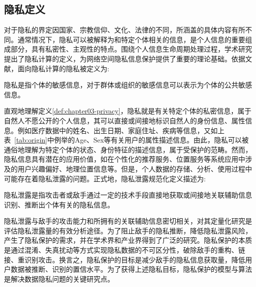 \subsection{隐私定义}
对于隐私的界定因国家、宗教信仰、文化、法律的不同，所涵盖的具体内容有所不同\cite{Lifenghua16}。通常情况下，隐私可以被解释为和特定个体相关的信息，是个人信息的重要组成部分，具有私密性、主观性的特点。围绕个人信息生命周期处理过程，学术研究提出了隐私计算的定义，为网络空间隐私信息保护提供了重要的理论基础\cite{Lifenghua16}。依据文献，面向隐私计算的隐私被定义为:

\begin{definition}\label{def:chapter03-privacy}隐私是指个体的敏感信息，对于群体或组织的敏感信息可以表示为个体的公共敏感信息。
\end{definition}
直观地理解定义\ref{def:chapter03-privacy}，隐私就是有关特定个体的私密信息，属于自然人不愿公开的个人信息，其可以直接或间接地标识自然人的身份信息、属性信息。例如医疗数据中的姓名、出生日期、家庭住址、疾病等信息，又如上表~\ref{tab:origin}中例举的Age、Sex等有关用户的属性描述信息。由此，隐私可以被通俗地理解为特定个体的状态、身份特征的描述信息，属于受保护的范畴。然而，隐私信息具有潜在的应用价值，如在个性化的推荐服务、位置服务等系统应用中涉及的用户兴趣偏好、地理位置信息等。但是，个人数据的存储、分析、使用过程中可能存在着隐私泄露的问题。正式地，隐私泄露规范化定义描述为:


\begin{definition}\label{def:chapter03-privacy_leakage}隐私泄露是指攻击者或敌手通过一定的技术手段直接地获取或间接地关联辅助信息识别、推断出个体有关的隐私信息。
\end{definition}
隐私泄露与敌手的攻击能力和所拥有的关联辅助信息密切相关，对其定量化研究是评估隐私泄露量的有效分析途径。为了阻止敌手的隐私推断，降低隐私泄露风险，产生了隐私保护的需求，并在学术界和产业界得到了广泛的研究。隐私保护的本质是通过混淆、失真扰动等方式实现隐私数据的不可区分性，破除敌手的重构、链接、重识别攻击。换言之，隐私保护的目标是减少敌手的隐私信息获取量，降低用户数据被推断、识别的置信水平。为了获得上述隐私目标，隐私保护的模型与算法是解决数据隐私问题的关键研究点。

